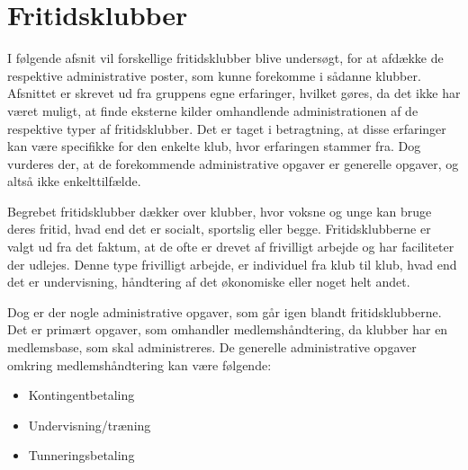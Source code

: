 \chapter{Fritidsklubber} \label{chap:Fritidsklubber}

I følgende afsnit vil forskellige fritidsklubber blive undersøgt, for at afdække de respektive administrative poster, som kunne forekomme i sådanne klubber. 
Afsnittet er skrevet ud fra gruppens egne erfaringer, hvilket gøres, da det ikke har været muligt, at finde eksterne kilder omhandlende administrationen af de respektive typer af fritidsklubber. 
Det er taget i betragtning, at disse erfaringer kan være specifikke for den enkelte klub, hvor erfaringen stammer fra. 
Dog vurderes der, at de forekommende administrative opgaver er generelle opgaver, og altså ikke enkelttilfælde. 

Begrebet fritidsklubber dækker over klubber, hvor voksne og unge kan bruge deres fritid, hvad end det er socialt, sportslig eller begge. 
Fritidsklubberne er valgt ud fra det faktum, at de ofte er drevet af frivilligt arbejde og har faciliteter der udlejes. 
Denne type frivilligt arbejde, er individuel fra klub til klub, hvad end det er undervisning, håndtering af det økonomiske eller noget helt andet. 

Dog er der nogle administrative opgaver, som går igen blandt fritidsklubberne.
Det er primært opgaver, som omhandler medlemshåndtering, da klubber har en medlemsbase, som skal administreres. 
De generelle administrative opgaver omkring medlemshåndtering kan være følgende:
\begin{itemize}
	\item Kontingentbetaling
	\item Undervisning/træning
	\item Tunneringsbetaling
\end{itemize}


